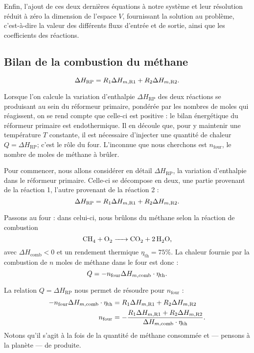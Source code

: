 Enfin, l'ajout de ces deux dernières équations à notre système et leur résolution\footnotemark{} réduit à zéro la dimension de l'espace $V$, fournissant la solution au problème, c'est-à-dire la valeur des différents fluxs d'entrée et de sortie, ainsi que les coefficients des réactions.

\subsection{Bilan de la combustion du méthane}

\[
    \Delta H_\text{RP} = R_1 \Delta H_{m,\text{R1}} + R_2 \Delta H_{m,\text{R2}}
    \text.
\]

Lorsque l'on calcule la variation d'enthalpie $\Delta H_\text{RP}$ des deux réactions se produisant au sein du réformeur primaire, pondérée par les nombres de moles qui réagissent, on se rend compte que celle-ci est positive : le bilan énergétique du réformeur primaire est endothermique. Il en découle que, pour y maintenir une température $T$ constante, il est nécessaire d'injecter une quantité de chaleur $Q = \Delta H_\text{RP}$; c'est le rôle du four. L'inconnue que nous cherchons est $n_\text{four}$, le nombre de moles de méthane à brûler.

Pour commencer, nous allons considérer en détail $\Delta H_\text{RP}$, la variation d'enthalpie dans le réformeur primaire. Celle-ci se décompose en deux, une partie provenant de la réaction 1, l'autre provenant de la réaction 2 :
\[
    \Delta H_\text{RP} = R_1 \Delta H_{m,\text{R1}} + R_2 \Delta H_{m,\text{R2}}
    \text.
\]

Passons au four : dans celui-ci, nous brûlons du méthane selon la réaction de combustion
\[\ce{CH4 + O2 -> CO2 + 2H2O}\text,\]
avec $\Delta H_\text{comb} < 0$ et un rendement thermique $\eta_\text{th} = 75\%$. La chaleur fournie par la combustion de $n$ moles de méthane dans le four est donc :
\[
    Q = - n_\text{four} \Delta H_{m,\text{comb}} \cdot \eta_\text{th}
    \text.
\]

La relation $Q = \Delta H_\text{RP}$ nous permet de résoudre pour $n_\text{four}$ :
\begin{align*}
    - n_\text{four} \Delta H_{m,\text{comb}} \cdot \eta_\text{th} &= R_1 \Delta H_{m,\text{R1}} + R_2 \Delta H_{m,\text{R2}} \\
    n_\text{four} &= -\frac{R_1 \Delta H_{m,\text{R1}} + R_2 \Delta H_{m,\text{R2}}}{\Delta H_{m,\text{comb}} \cdot \eta_\text{th}}
    \text.
\end{align*}
Notons qu'il s'agit à la fois de la quantité de méthane consommée et --- pensons à la planète --- de  produite.

